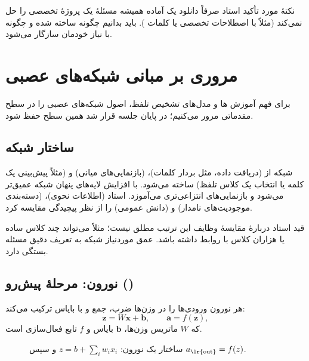 \begin{exambox}{نکتهٔ مورد تأکید استاد}
صرفاً دانلود یک  آماده همیشه مسئلهٔ یک پروژهٔ تخصصی را حل نمی‌کند (مثلاً با اصطلاحات تخصصی یا کلمات ). باید بدانیم  چگونه ساخته شده و چگونه با نیاز خودمان سازگار می‌شود.
\end{exambox}

\section{مروری بر مبانی شبکه‌های عصبی}

برای فهم آموزش ها و مدل‌های تشخیص تلفظ، اصول شبکه‌های عصبی را در سطح مقدماتی مرور می‌کنیم؛ در پایان جلسه قرار شد همین سطح حفظ شود.

\subsection{ساختار شبکه}
شبکه از  (دریافت داده، مثل بردار کلمات)،  (بازنمایی‌های میانی) و  (مثلاً پیش‌بینی یک کلمه یا انتخاب یک کلاس تلفظ) ساخته می‌شود. با افزایش لایه‌های پنهان شبکه عمیق‌تر می‌شود و بازنمایی‌های انتزاعی‌تری می‌آموزد. استاد  (اطلاعات نحوی)،  (دسته‌بندی موجودیت‌های نامدار) و  (دانش عمومی) را از نظر پیچیدگی مقایسه کرد.

\begin{exambox}{قید استاد دربارهٔ مقایسهٔ وظایف}
این ترتیب مطلق نیست؛ مثلاً  می‌تواند چند کلاس ساده یا هزاران کلاس با روابط  داشته باشد. عمق موردنیاز شبکه به تعریف دقیق مسئله بستگی دارد.
\end{exambox}

\subsection{نورون: مرحلهٔ پیش‌رو ()}
هر نورون ورودی‌ها را در وزن‌ها ضرب، جمع و با بایاس ترکیب می‌کند:
\[
\mathbf{z}=W\mathbf{x}+\mathbf{b},\qquad \mathbf{a}=f(\mathbf{z}),
\]
که $W$ ماتریس وزن‌ها، $\mathbf{b}$ بایاس و $f$ تابع فعال‌سازی است.

\begin{figure}[htbp]
\centering
{}
\caption{ساختار یک نورون: $z=b+\sum_i w_ix_i$ و سپس $a_{\text{\lr{out}}}=f(z)$.}
\end{figure}


